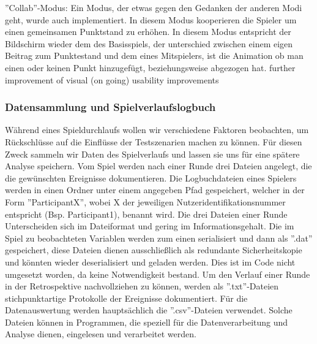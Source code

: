 \item''Collab''-Modus:\newline
Ein Modus, der etwas gegen den Gedanken der anderen Modi geht, wurde auch implementiert.  In diesem Modus kooperieren die Spieler um einen gemeinsamen Punktstand zu erhöhen. In diesem Modus entspricht der Bildschirm wieder dem des Basisspiels, der unterschied zwischen einem eigen Beitrag zum Punktestand und dem eines Mitspielers, ist die Animation ob man einen oder keinen Punkt hinzugefügt, beziehungsweise abgezogen hat.
\newline
further improvement of visual (on going)\newline
usability improvements

\subsubsection{Datensammlung und Spielverlaufslogbuch}
Während eines Spieldurchlaufs wollen wir verschiedene Faktoren beobachten, um Rückschlüsse auf die Einflüsse der Testszenarien  machen zu können. Für diesen Zweck sammeln wir  Daten des Spielverlaufs und lassen sie uns für eine spätere Analyse speichern. Vom Spiel werden nach einer Runde drei Dateien angelegt, die die gewünschten Ereignisse dokumentieren. Die Logbuchdateien eines Spielers werden in einen Ordner unter einem angegeben Pfad gespeichert, welcher in der Form ''ParticipantX'', wobei X der jeweiligen Nutzeridentifikationsnummer entspricht (Bsp. Participant1), benannt wird. Die drei Dateien einer Runde Unterscheiden sich im Dateiformat und gering  im Informationsgehalt. Die im Spiel zu beobachteten Variablen werden zum einen serialisiert und dann als ''.dat'' gespeichert, diese Dateien dienen ausschließlich als redundante Sicherheitskopie und könnten wieder deserialisiert und  geladen werden. Dies ist im Code nicht umgesetzt worden, da keine Notwendigkeit bestand.\newline
Um den Verlauf einer Runde in der Retrospektive nachvollziehen zu können, werden als ''.txt''-Dateien stichpunktartige Protokolle der Ereignisse dokumentiert.\newline
Für die Datenauswertung  werden hauptsächlich die ''.csv''-Dateien verwendet. Solche Dateien können in Programmen, die speziell für die Datenverarbeitung  und Analyse dienen, eingelesen und verarbeitet werden.
